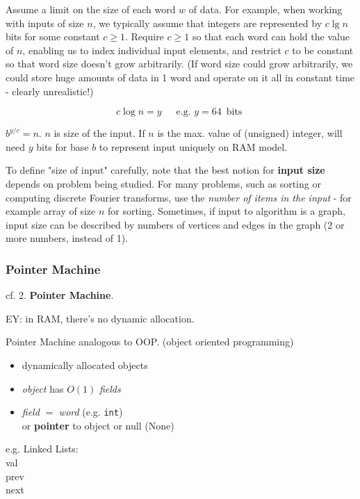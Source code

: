\documentclass[10pt]{amsart}
\begin{document}
\begin{multicols*}{2}
Assume a limit on the size of each word $w$ of data. For example, when working with inputs of size $n$, we typically assume that integers are represented by $c\lg{n}$ bits for some constant $c\geq 1$. Require $c\geq 1$ so that each word can hold the value of $n$, enabling us to index individual input elements, and restrict $c$ to be constant so that word size doesn't grow arbitrarily. (If word size could grow arbitrarily, we could store huge amounts of data in 1 word and operate on it all in constant time - clearly unrealistic!)

\[
c \log{n} =  y \quad \, \text{ e.g. } y = 64 \, \text{ bits }
\]

$b^{y/c} = n$. $n$ is size of the input. If $n$ is the max. value of (unsigned) integer, will need $y$ bits for base $b$ to represent input uniquely on RAM model.

To define "size of input" carefully, note that the best notion for \textbf{input size} depends on problem being studied. For many problems, such as sorting or computing discrete Fourier transforms, use the \emph{number of items in the input} - for example array of size $n$ for sorting. Sometimes, if input to algorithm is a graph, input size can be described by numbers of vertices and edges in the graph (2 or more numbers, instead of 1).


\subsubsection{Pointer Machine}

cf. 2. \textbf{Pointer Machine}.

EY: in RAM, there's no dynamic allocation.

Pointer Machine analogous to OOP. (object oriented programming)

\begin{itemize}
	\item dynamically allocated objects 
	\item \emph{object} has $O(1)$ \emph{fields}
	\item \emph{field} $=$ \emph{word} (e.g. \texttt{int}) \\
	or \textbf{pointer} to object or null (None)
\end{itemize}

e.g. Linked Lists: \\

val \\
prev \\
next \\


\end{multicols*}
\end{document}
